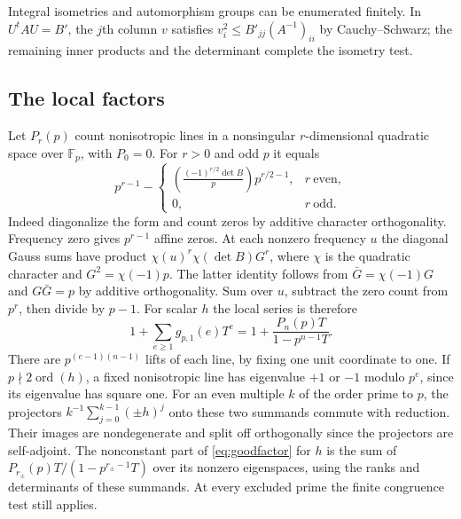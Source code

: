 Integral isometries and automorphism groups can be enumerated
finitely. In $U^t A U=B'$, the $j$th column $v$ satisfies
$v_i^2\le B'_{jj}(A^{-1})_{ii}$ by Cauchy--Schwarz; the remaining
inner products and the determinant complete the isometry test.

\subsection{The local factors}
Let $P_r(p)$ count nonisotropic lines in a nonsingular $r$-dimensional quadratic space over $\mathbb F_p$, with $P_0=0$. For $r>0$ and odd $p$ it equals
\[
 p^{r-1}-
 \begin{cases}
 \left(\frac{(-1)^{r/2}\det B}{p}\right)p^{r/2-1},&r\ \mathrm{even},\\
 0,&r\ \mathrm{odd}.
 \end{cases}
\]
Indeed diagonalize the form and count zeros by additive character orthogonality. Frequency zero gives $p^{r-1}$ affine zeros. At each nonzero frequency $u$ the diagonal Gauss sums have product $\chi(u)^r\chi(\det B)G^r$, where $\chi$ is the quadratic character and $G^2=\chi(-1)p$. The latter identity follows from $\bar G=\chi(-1)G$ and $G\bar G=p$ by additive orthogonality. Sum over $u$, subtract the zero count from $p^r$, then divide by $p-1$. For scalar $h$ the local series is therefore
\begin{equation}\label{eq:goodfactor}
 1+\sum_{e\ge1}g_{p,1}(e)T^e
 =1+\frac{P_n(p)T}{1-p^{n-1}T}.
\end{equation}
There are $p^{(e-1)(n-1)}$ lifts of each line, by fixing one unit coordinate to one. If $p\nmid 2\operatorname{ord}(h)$, a fixed nonisotropic line has eigenvalue $+1$ or $-1$ modulo $p^e$, since its eigenvalue has square one. For an even multiple $k$ of the order prime to $p$, the projectors $k^{-1}\sum_{j=0}^{k-1}(\pm h)^j$ onto these two summands commute with reduction. Their images are nondegenerate and split off orthogonally since the projectors are self-adjoint. The nonconstant part of \eqref{eq:goodfactor} for $h$ is the sum of $P_{r_\pm}(p)T/(1-p^{r_\pm-1}T)$ over its nonzero eigenspaces, using the ranks and determinants of these summands. At every excluded prime the finite congruence test still applies.
